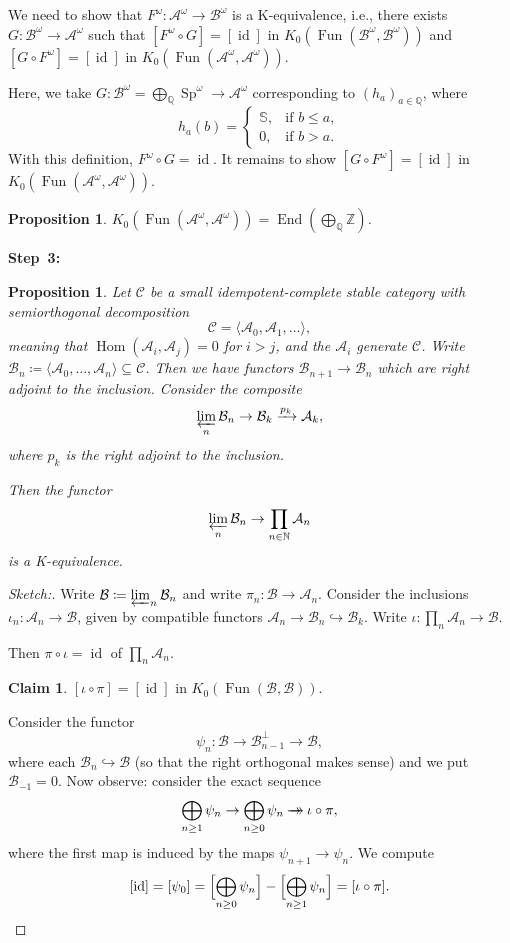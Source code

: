\documentclass[draft]{amsart}
\newcommand{\NN}{\mathbb{N}}
\newcommand{\ZZ}{\mathbb{Z}}
\newcommand{\QQ}{\mathbb{Q}}
\renewcommand{\SS}{\mathbb{S}}
\newcommand{\cat}[1]{\mathcal{#1}}
\newcommand{\injto}{\mathbin{\hookrightarrow}}
\newcommand{\epito}{\mathbin{\to\kern-.8em\to}}
\DeclareMathOperator{\Hom}{Hom}
\DeclareMathOperator{\End}{End}
\DeclareMathOperator{\Sp}{Sp}
\DeclareMathOperator{\Fun}{Fun}
\DeclareMathOperator{\id}{id}
\newtheorem{prop}[thm]{Proposition}
\theoremstyle{definition}
\newtheorem*{claim}{Claim}
\begin{document}
We need to show that $F^{\omega} \colon \cat A^\omega \to \cat B^\omega$ is a K-equivalence, i.e., there exists $G\colon \cat B^\omega \to \cat A^\omega$ such that $[F^\omega\circ G] = [\id]$ in $K_0(\Fun(\cat B^\omega, \cat B^\omega))$ and $[G\circ F^\omega] = [\id]$ in $K_0(\Fun(\cat A^\omega, \cat A^\omega))$.

Here, we take $G\colon \cat B^\omega = \bigoplus_{\QQ}\Sp^{\omega} \to \cat A^\omega$ corresponding to $(h_a)_{a\in \QQ}$, where
\[
h_a(b)= \begin{cases}
\SS, & \text{if $b\le a$}, \\
0, & \text{if $b>a$}.
\end{cases}
\]
With this definition, $F^\omega\circ G = \id$. It remains to show $[G\circ F^\omega] = [\id]$ in $K_0(\Fun(\cat A^\omega, \cat A^\omega))$.

\begin{prop}
$K_0(\Fun(\cat A^\omega, \cat A^\omega)) = \End(\bigoplus_{\QQ}\ZZ)$.
\end{prop}

\textbf{Step~3:}
\begin{prop}
Let $\cat C$ be a small idempotent-complete stable category with semiorthogonal decomposition
\[
\cat C = \langle \cat A_0, \cat A_1, \dotsc \rangle,
\]
meaning that $\Hom(\cat A_i, \cat A_j) = 0$ for $i>j$, and the $\cat A_i$ generate $\cat C$. Write $\cat B_n \coloneqq \langle \cat A_0,\dotsc,\cat A_n\rangle \subseteq \cat C$. Then we have functors $\cat B_{n+1} \to \cat B_n$ which are right adjoint to the inclusion. Consider the composite
\[
\varprojlim_n \cat B_n \to \cat B_k \xrightarrow{p_k} \cat A_k,
\]
where $p_k$ is the right adjoint to the inclusion. 

Then the functor
\[
\varprojlim_n \cat B_n \to \prod_{n\in \NN} \cat A_n
\]
is a K-equivalence.
\end{prop}
\begin{proof}[Sketch:]
Write $\cat B \coloneqq \varprojlim_n \cat B_n$ and write $\pi_n\colon \cat B\to \cat A_n$. Consider the inclusions $\iota_n\colon \cat A_n\to \cat B$, given by compatible functors $\cat A_n\to \cat B_n \injto \cat B_k$. Write $\iota\colon \prod_n \cat A_n \to \cat B$. 

Then $\pi\circ\iota = \id$ of $\prod_n\cat A_n$.

\begin{claim}
$[\iota\circ\pi] = [\id]$ in $K_0(\Fun(\cat B, \cat B))$.
\end{claim}
Consider the functor 
\[
\psi_n\colon \cat B\to \cat B_{n-1}^{\perp} \to \cat B,
\]
where each $\cat B_n \injto \cat B$ (so that the right orthogonal makes sense) and we put $\cat B_{-1} = 0$. Now observe: consider the exact sequence
\[
\bigoplus_{n\ge1} \psi_n \to \bigoplus_{n\ge0} \psi_n \epito \iota\circ\pi,
\]
where the first map is induced by the maps $\psi_{n+1} \to \psi_n$. We compute
\[
[\id]  = [\psi_0] = \Bigl[\bigoplus_{n\ge0} \psi_n\Bigr] - \Bigl[\bigoplus_{n\ge1}\psi_n\Bigr] = [\iota\circ\pi].
\]
\end{proof}
\end{document}
